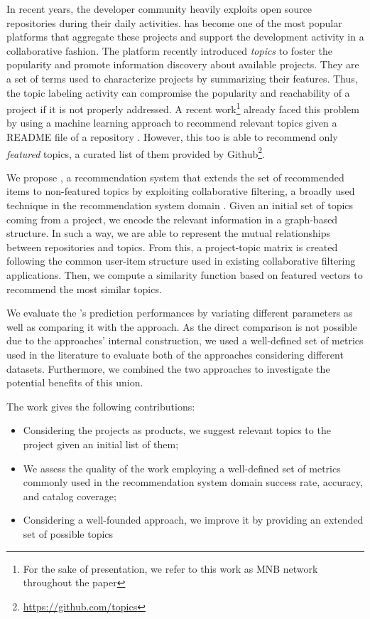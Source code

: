 In recent years, the developer community heavily exploits open source repositories during their daily activities. \GH has become one of the most
popular platforms that aggregate these projects and
support the development activity in a collaborative fashion.
%
The platform recently introduced \emph{topics} to foster the popularity and promote information discovery about available projects. They are a set of terms used to characterize projects by summarizing their features.  
Thus, the topic labeling activity can compromise the popularity and reachability of a project if it is not properly addressed. A recent work\footnote{For the sake of presentation, we refer to this work as MNB network throughout the paper} already faced this problem by using a machine learning approach to recommend relevant topics given a README file of a repository \cite{10.1145/3383219.3383227}. However, this too is able to recommend only \emph{featured} topics, a curated list of them provided by Github\footnote{\url{https://github.com/topics}}.
 
We propose \CT, a recommendation system that extends the set of recommended items to non-featured topics by exploiting collaborative filtering, a broadly used technique in the recommendation system domain \cite{Schafer:2007:CFR:1768197.1768208}. Given an initial set of topics coming from a \GH project, we encode the relevant information in a graph-based structure. In such a way, we are able to represent the mutual relationships between repositories and topics. From this, a project-topic matrix is created following the common user-item structure used in existing collaborative filtering applications. Then, we compute a similarity function based on featured vectors to recommend the most similar topics.

We evaluate the \CT's prediction performances by variating different parameters as well as comparing it with the \MNB approach. As the direct comparison is not possible due to the approaches' internal construction, we used a well-defined set of metrics used in the literature to evaluate both of the approaches considering different datasets. Furthermore, we combined the two approaches to investigate the potential benefits of this union. 

The work gives the following contributions:
\begin{itemize}
\item Considering the \GH projects as products, we suggest relevant topics to the project given an initial list of them;
\item We assess the quality of the work employing a well-defined set of metrics commonly used in the recommendation system domain \ie success rate, accuracy, and catalog coverage;
\item Considering a well-founded approach, we improve it by providing an extended set of possible topics  
\end{itemize}

